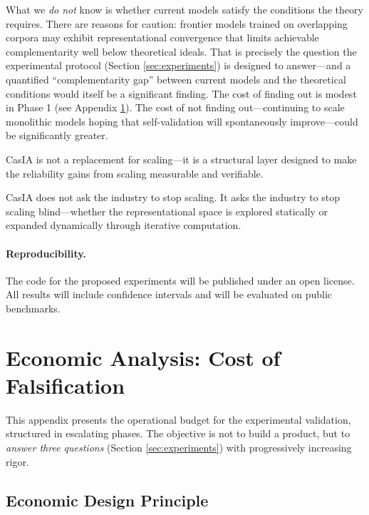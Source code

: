 \documentclass[11pt,a4paper]{article}
\theoremstyle{remark}
\begin{document}
What we \emph{do not} know is whether current models satisfy the conditions the theory requires. There are reasons for caution: frontier models trained on overlapping corpora may exhibit representational convergence that limits achievable complementarity well below theoretical ideals. That is precisely the question the experimental protocol (Section \ref{sec:experiments}) is designed to answer---and a quantified ``complementarity gap'' between current models and the theoretical conditions would itself be a significant finding. The cost of finding out is modest in Phase 1 (see Appendix \ref{sec:economic}). The cost of not finding out---continuing to scale monolithic models hoping that self-validation will spontaneously improve---could be significantly greater.

CasIA is not a replacement for scaling---it is a structural layer designed to make the reliability gains from scaling measurable and verifiable.

\medskip

CasIA does not ask the industry to stop scaling. It asks the industry to stop scaling blind---whether the representational space is explored statically or expanded dynamically through iterative computation.

\vspace{1em}

\paragraph{Reproducibility.} The code for the proposed experiments will be published under an open license. All results will include confidence intervals and will be evaluated on public benchmarks.

\newpage

\appendix
\section{Economic Analysis: Cost of Falsification}
\label{sec:economic}

This appendix presents the operational budget for the experimental validation, structured in escalating phases. The objective is not to build a product, but to \emph{answer three questions} (Section \ref{sec:experiments}) with progressively increasing rigor.

\subsection{Economic Design Principle}
\end{document}
